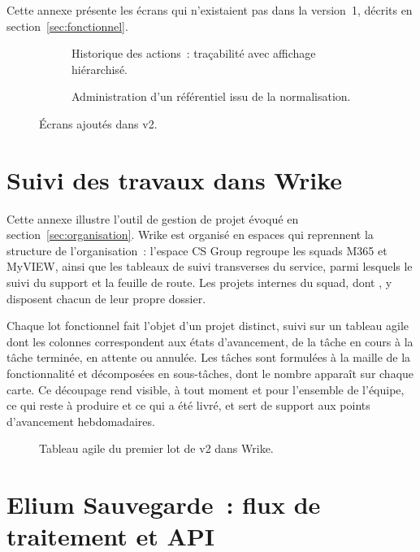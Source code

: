 Cette annexe présente les écrans qui n'existaient pas dans la version~1, décrits
en section~\ref{sec:fonctionnel}.

\begin{figure}[H]
  \centering
  \begin{subfigure}[t]{0.48\textwidth}
    \centering
    \caption{Historique des actions~: traçabilité avec affichage hiérarchisé.}
    \label{fig:ann-historique}
  \end{subfigure}
  \hfill
  \begin{subfigure}[t]{0.48\textwidth}
    \centering
    \caption{Administration d'un référentiel issu de la normalisation.}
    \label{fig:ann-admin}
  \end{subfigure}
  \caption{Écrans ajoutés dans \csbag v2.}
  \label{fig:ann-ecrans}
\end{figure}

\section{Suivi des travaux dans Wrike}
\label{ann:wrike}

Cette annexe illustre l'outil de gestion de projet évoqué en
section~\ref{sec:organisation}. Wrike est organisé en espaces qui reprennent la
structure de l'organisation~: l'espace CS Group regroupe les squads M365 et
MyVIEW, ainsi que les tableaux de suivi transverses du service, parmi lesquels
le suivi du support et la feuille de route. Les projets internes du squad, dont
\csbag, y disposent chacun de leur propre dossier.

Chaque lot fonctionnel fait l'objet d'un projet distinct, suivi sur un tableau
agile dont les colonnes correspondent aux états d'avancement, de la tâche en
cours à la tâche terminée, en attente ou annulée. Les tâches sont formulées à
la maille de la fonctionnalité et décomposées en sous-tâches, dont le nombre
apparaît sur chaque carte. Ce découpage rend visible, à tout moment et pour
l'ensemble de l'équipe, ce qui reste à produire et ce qui a été livré, et sert
de support aux points d'avancement hebdomadaires.

\begin{figure}[H]
  \centering
  \caption{Tableau agile du premier lot de \csbag v2 dans Wrike.}
  \label{fig:ann-wrike}
\end{figure}

\section{Elium Sauvegarde~: flux de traitement et API}
\label{ann:elium}

